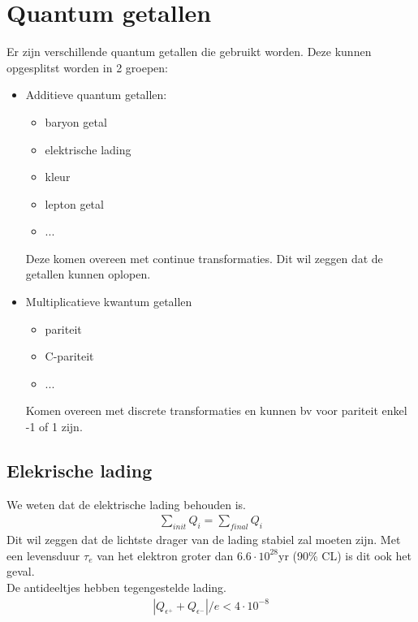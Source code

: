 \documentclass[../main.tex]{subfiles}
\begin{document}
\section{Quantum getallen}%
\label{sec:quantum_getallen}

Er zijn verschillende quantum getallen die gebruikt worden. Deze kunnen opgesplitst worden in 2 groepen:
\begin{itemize}
    \item Additieve quantum getallen:
        \begin{itemize}
            \item baryon getal
            \item elektrische lading
            \item kleur
            \item lepton getal
            \item ...
        \end{itemize}
        Deze komen overeen met continue transformaties. Dit wil zeggen dat de getallen kunnen oplopen.
    \item Multiplicatieve kwantum getallen
        \begin{itemize}
            \item pariteit
            \item C-pariteit
            \item ...
        \end{itemize}
        Komen overeen met discrete transformaties en kunnen bv voor pariteit enkel -1 of 1 zijn.
\end{itemize}

\subsection{Elekrische lading}%
\label{sub:elekrische_lading}

We weten dat de elektrische lading behouden is.
\begin{equation}
    \begin{aligned}
        \label{eq:cons_lading}
        \sum_{init} Q_i = \sum_{final} Q_i
    \end{aligned}
\end{equation}
Dit wil zeggen dat de lichtste drager van de lading stabiel zal moeten zijn. Met een levensduur $\tau_e$ van het elektron groter dan $6.6\cdot 10^{28}$yr (90\% CL) is dit ook het geval.\\
De antideeltjes hebben tegengestelde lading.
\begin{equation}
    \begin{aligned}
        \label{eq:anti_deeltje_lading}
        |Q_{\epsilon^+}+Q_{\epsilon^-}|/e < 4\cdot 10^{-8}
    \end{aligned}
\end{equation}
\end{document}
